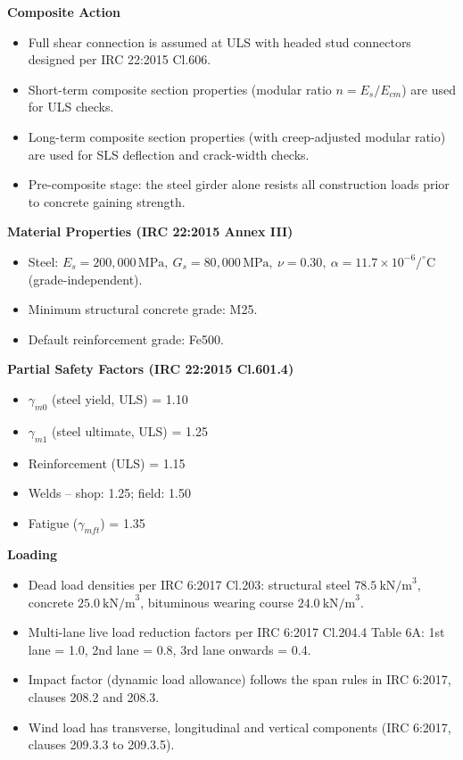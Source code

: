 \documentclass[12pt,a4paper]{report}
\numberwithin{table}{chapter}
\numberwithin{figure}{chapter}
\begin{document}
\textbf{Composite Action}

\begin{itemize}
    \item Full shear connection is assumed at ULS with headed stud connectors designed per IRC 22:2015 Cl.606.
    \item Short-term composite section properties (modular ratio $n = E_s/E_{cm}$) are used for ULS checks.
    \item Long-term composite section properties (with creep-adjusted modular ratio) are used for SLS deflection and crack-width checks.
    \item Pre-composite stage: the steel girder alone resists all construction loads prior to concrete gaining strength.
\end{itemize}


\textbf{Material Properties (IRC 22:2015 Annex III)}

\begin{itemize}
\item Steel: $E_s = 200{,}000 \, \text{MPa}, \ G_s = 80{,}000 \, \text{MPa}, \ \nu = 0.30, \ \alpha = 11.7 \times 10^{-6}/^\circ\mathrm{C}$ (grade-independent).
\item Minimum structural concrete grade: M25.
\item Default reinforcement grade: Fe500.
\end{itemize}

\textbf{Partial Safety Factors (IRC 22:2015 Cl.601.4)}

\begin{itemize}
\item $\gamma_{m0}$ (steel yield, ULS) = 1.10
\item $\gamma_{m1}$ (steel ultimate, ULS) = 1.25
\item Reinforcement (ULS) = 1.15
\item Welds -- shop: 1.25; field: 1.50
\item Fatigue ($\gamma_{mft}$) = 1.35
\end{itemize}

\textbf{Loading}

\begin{itemize}
\item Dead load densities per IRC 6:2017 Cl.203: structural steel $78.5 \ \text{kN/m}^3$, concrete $25.0 \ \text{kN/m}^3$, bituminous wearing course $24.0 \ \text{kN/m}^3$.
\item Multi-lane live load reduction factors per IRC 6:2017 Cl.204.4 Table 6A: 1st lane = 1.0, 2nd lane = 0.8, 3rd lane onwards = 0.4.
\item Impact factor (dynamic load allowance) follows the span rules in IRC 6:2017, clauses 208.2 and 208.3.
\item Wind load has transverse, longitudinal and vertical components (IRC 6:2017, clauses 209.3.3 to 209.3.5).
\end{itemize}
\end{document}
